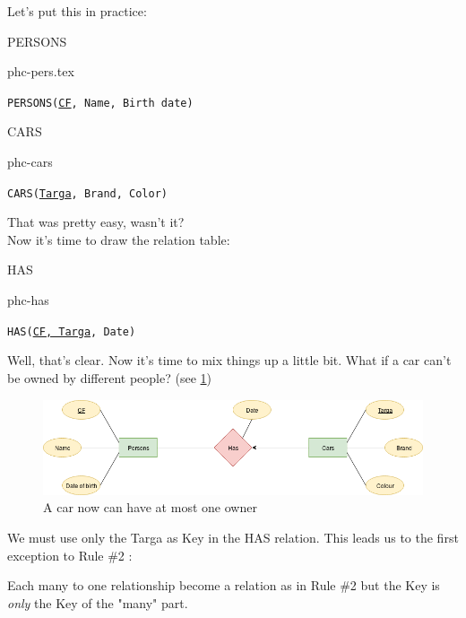 \documentclass[class=book, crop=false, oneside]{standalone}
\begin{document}
Let's put this in practice:
\vskip 20pt
\begin{minipage}{0.45\textwidth}
	PERSONS
	\begin{table}[H]
		\centering
		{phc-pers.tex}
	\end{table}
	\texttt{PERSONS(\underline{CF}, Name, Birth date)}
\end{minipage}
\hspace{.1\textwidth}
\begin{minipage}{.45\textwidth}
	CARS
	\begin{table}[H]
		\centering
		{phc-cars}
	\end{table}
	\texttt{CARS(\underline{Targa}, Brand, Color)}
\end{minipage}
\vskip 20pt
That was pretty easy, wasn't it?\\
Now it's time to draw the relation table:
\vskip 20pt
\begin{minipage}{.7\textwidth}
	HAS
	\begin{table}[H]
		{phc-has}
	\end{table}
	\texttt{HAS(\underline{CF, Targa}, Date)}
\end{minipage}
\vskip 20pt
Well, that's clear. Now it's time to mix things up a little bit.
What if a car can't be owned by different people? (see \ref{diagram1_01})
\begin{figure}[H]
	\centering
	\includegraphics[width=\textwidth,keepaspectratio]{diagram1_01.png}
	\caption{A car now can have at most one owner}
	\label{diagram1_01}
\end{figure}
We must use only the Targa as Key in the HAS relation. This leads us to the first exception to Rule \#2	:

Each many to one relationship become a relation as in Rule \#2 but the Key is \emph{only} the Key of the "many" part.
\end{document}
